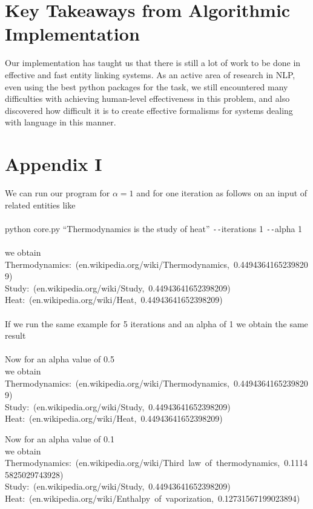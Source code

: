 \documentclass[twoside,11pt]{article}
\begin{document}
\section{Key Takeaways from Algorithmic Implementation}

Our implementation has taught us that there is still a lot of work to be done in effective and fast entity linking systems. As an active area of research in NLP, even using the best python packages for the task, we still encountered many difficulties with achieving human-level effectiveness in this problem, and also discovered how difficult it is to create effective formalisms for systems dealing with language in this manner.

\section{Appendix I}
We can run our program for $\alpha = 1$ and for one iteration as follows on an input of related entities like
\\ \\
python core.py ``Thermodynamics is the study of heat'' \texttt{-{}-}iterations 1 \texttt{-{}-}alpha 1
\\ \\
we obtain
\mbox{Thermodynamics: (en.wikipedia.org/wiki/Thermodynamics, 0.44943641652398209)}
\\
\mbox{Study: (en.wikipedia.org/wiki/Study, 0.44943641652398209)}
\\
\mbox{Heat: (en.wikipedia.org/wiki/Heat, 0.44943641652398209)}
\\ \\
If we run the same example for 5 iterations and an alpha of 1 we obtain the same result
\\ \\

Now for an alpha value of 0.5
\\
we obtain
\mbox{Thermodynamics: (en.wikipedia.org/wiki/Thermodynamics, 0.44943641652398209)}
\\
\mbox{Study: (en.wikipedia.org/wiki/Study, 0.44943641652398209)}
\\
\mbox{Heat: (en.wikipedia.org/wiki/Heat, 0.44943641652398209)}

Now for an alpha value of 0.1
\\
we obtain
\mbox{Thermodynamics: (en.wikipedia.org/wiki/Third law of thermodynamics, 0.11145825029743928)}
\\
\mbox{Study: (en.wikipedia.org/wiki/Study, 0.44943641652398209)}
\\
\mbox{Heat: (en.wikipedia.org/wiki/Enthalpy of vaporization, 0.12731567199023894)}
\end{document}
